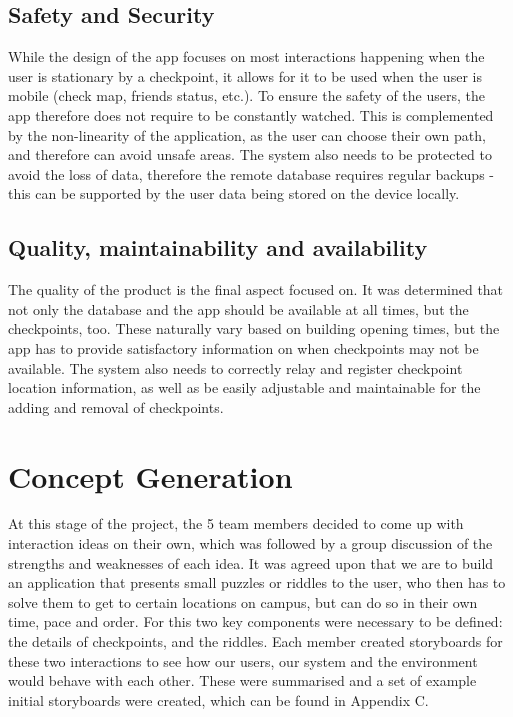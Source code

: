 \documentclass[10pt,twocolumn]{article} %
\begin{document}
\subsection*{Safety and Security}
While the design of the app focuses on most interactions happening when the user is stationary by a checkpoint, it allows for it to be used when the user is mobile (check map, friends status, etc.). To ensure the safety of the users, the app therefore does not require to be constantly watched. This is complemented by the non-linearity of the application, as the user can choose their own path, and therefore can avoid unsafe areas. The system also needs to be protected to avoid the loss of data, therefore the remote database requires regular backups - this can be supported by the user data being stored on the device locally.
\subsection*{Quality, maintainability and availability}
The quality of the product is the final aspect focused on. It was determined that not only the database and the app should be available at all times, but the checkpoints, too. These naturally vary based on building opening times, but the app has to provide satisfactory information on when checkpoints may not be available. The system also needs to correctly relay and register checkpoint location information, as well as be easily adjustable and maintainable for the adding and removal of checkpoints. 

\section*{Concept Generation}
At this stage of the project, the 5 team members decided to come up with interaction ideas on their own, which was followed by a group discussion of the strengths and weaknesses of each idea.
It was agreed upon that we are to build an application that presents small puzzles or riddles to the user, who then has to solve them to get to certain locations on campus, but can do so in their own time, pace and order.
For this two key components were necessary to be defined: the details of checkpoints, and the riddles.
Each member created storyboards for these two interactions to see how our users, our system and the environment would behave with each other.
These were summarised and a set of example initial storyboards were created, which can be found in Appendix C. 
\end{document}
